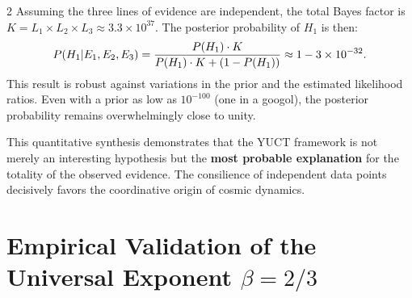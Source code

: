 \documentclass[12pt,a4paper]{article}
\begin{document}
\begin{multicols}{2}
		Assuming the three lines of evidence are independent, the total Bayes factor is \(K = L_1 \times L_2 \times L_3 \approx 3.3 \times 10^{37}\). The posterior probability of \(H_1\) is then:
		\begin{equation}
			\scriptsize
			P(H_1 | E_1, E_2, E_3) = \frac{P(H_1) \cdot K}{P(H_1) \cdot K + (1 - P(H_1))} \approx 1 - 3 \times 10^{-32}.
		\end{equation}
		This result is robust against variations in the prior and the estimated likelihood ratios. Even with a prior as low as \(10^{-100}\) (one in a googol), the posterior probability remains overwhelmingly close to unity.
		
		This quantitative synthesis demonstrates that the YUCT framework is not merely an interesting hypothesis but the \textbf{most probable explanation} for the totality of the observed evidence. The consilience of independent data points decisively favors the coordinative origin of cosmic dynamics.
		
	\end{multicols}
	
	
	\part{Empirical Validation of the Universal Exponent \(\beta = 2/3\)}
	\label{part:V}
	
\end{document}
